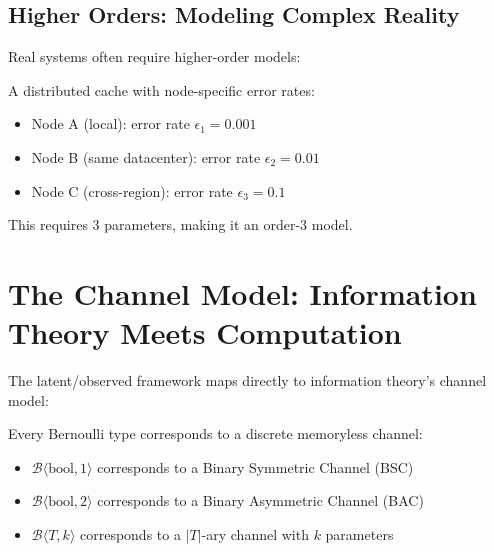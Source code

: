 \subsection{Higher Orders: Modeling Complex Reality}

Real systems often require higher-order models:

\begin{example}
A distributed cache with node-specific error rates:
\begin{itemize}
\item Node A (local): error rate $\epsilon_1 = 0.001$
\item Node B (same datacenter): error rate $\epsilon_2 = 0.01$  
\item Node C (cross-region): error rate $\epsilon_3 = 0.1$
\end{itemize}
This requires 3 parameters, making it an order-3 model.
\end{example}

\section{The Channel Model: Information Theory Meets Computation}

The latent/observed framework maps directly to information theory's channel model:

\begin{theorem}
Every Bernoulli type corresponds to a discrete memoryless channel:
\begin{itemize}
\item $\mathcal{B}\langle\text{bool}, 1\rangle$ corresponds to a Binary Symmetric Channel (BSC)
\item $\mathcal{B}\langle\text{bool}, 2\rangle$ corresponds to a Binary Asymmetric Channel (BAC)
\item $\mathcal{B}\langle T, k\rangle$ corresponds to a $|T|$-ary channel with $k$ parameters
\end{itemize}
\end{theorem}

